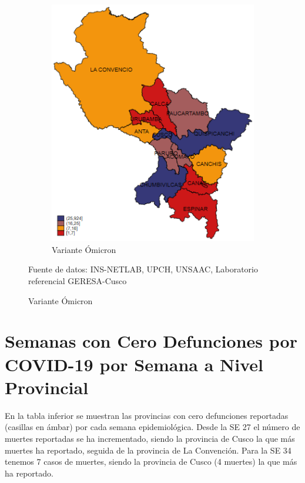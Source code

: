\documentclass[12pt,a4paper,openany]{book}
\begin{document}
\begin{figure}[h]
\begin{subfigure}[b]{0.40\textwidth}
			\includegraphics[width=\textwidth]{../figuras/variantes_provincial_omicron.png}
			\caption{Variante Ómicron}
		\end{subfigure}
	{\footnotesize {Fuente de datos: INS-NETLAB, UPCH, UNSAAC, Laboratorio referencial GERESA-Cusco}}
	\end{figure}
	
	\clearpage
	
	
	
	\clearpage
	\section*{Semanas con Cero Defunciones por COVID-19 por Semana a Nivel Provincial}
	
	\noindent En la tabla inferior se muestran las provincias con cero defunciones reportadas (casillas en ámbar) por cada semana epidemiológica. Desde la SE 27 el número de muertes reportadas se ha incrementado, siendo la provincia de Cusco la que más muertes ha reportado, seguida de la provincia de La Convención. Para la SE 34 tenemos 7 casos de muertes, siendo la provincia de Cusco (4 muertes) la que más ha reportado.
	
\end{document}
